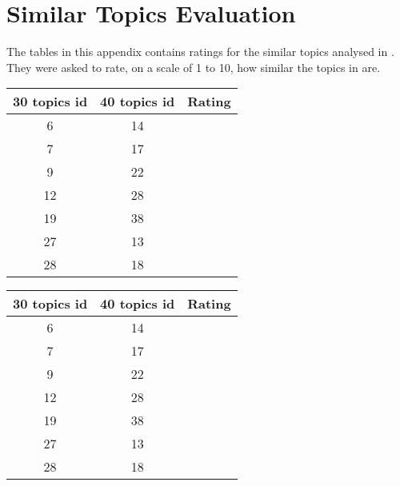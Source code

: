 \chapter{Similar Topics Evaluation}
\label{cha:similar_topics_evaluation}
The tables in this appendix contains ratings for the similar topics analysed in
. They were asked to rate, on a scale of 1 to 10, how
similar the topics in  are.


\begin{table}[H]
  \begin{subtable}{.5\linewidth}
    \centering
    \begin{tabular}{c c c} \toprule
      30 topics id & 40 topics id & Rating  \\ \midrule
          6        &    14        &  \\ \midrule
          7        &    17        &  \\ \midrule
          9        &    22        &  \\ \midrule
          12       &    28        &  \\ \midrule
          19       &    38        &  \\ \midrule
          27       &    13        &  \\ \midrule
          28       &    18        &  \\ \bottomrule
    \end{tabular}
  \end{subtable}
  \begin{subtable}{.5\linewidth}
    \centering
    \begin{tabular}{c c c} \toprule
      30 topics id & 40 topics id & Rating  \\ \midrule
          6        &    14        &  \\ \midrule
          7        &    17        &  \\ \midrule
          9        &    22        &  \\ \midrule
          12       &    28        &  \\ \midrule
          19       &    38        &  \\ \midrule
          27       &    13        &  \\ \midrule
          28       &    18        &  \\ \bottomrule
    \end{tabular}
  \end{subtable}
\end{table}


